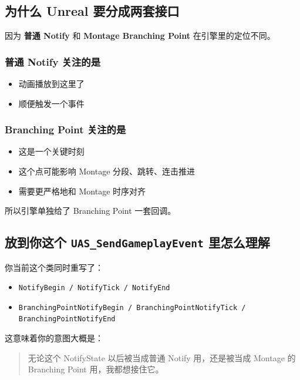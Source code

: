 \subsection{为什么 Unreal 要分成两套接口}

因为 \textbf{普通 Notify} 和 \textbf{Montage Branching Point} 在引擎里的定位不同。

\subsubsection{普通 Notify 关注的是}

\begin{itemize}
	\item 动画播放到这里了
	\item 顺便触发一个事件
\end{itemize}

\subsubsection{Branching Point 关注的是}

\begin{itemize}
	\item 这是一个关键时刻
	\item 这个点可能影响 Montage 分段、跳转、连击推进
	\item 需要更严格地和 Montage 时序对齐
\end{itemize}

所以引擎单独给了 Branching Point 一套回调。

\subsection{放到你这个 \texttt{UAS\_SendGameplayEvent} 里怎么理解}

你当前这个类同时重写了：

\begin{itemize}
	\item \verb|NotifyBegin / NotifyTick / NotifyEnd|
	\item \verb|BranchingPointNotifyBegin / BranchingPointNotifyTick / BranchingPointNotifyEnd|
\end{itemize}

这意味着你的意图大概是：

\begin{quote}
	无论这个 NotifyState 以后被当成普通 Notify 用，还是被当成 Montage 的 Branching Point 用，我都想接住它。
\end{quote}

